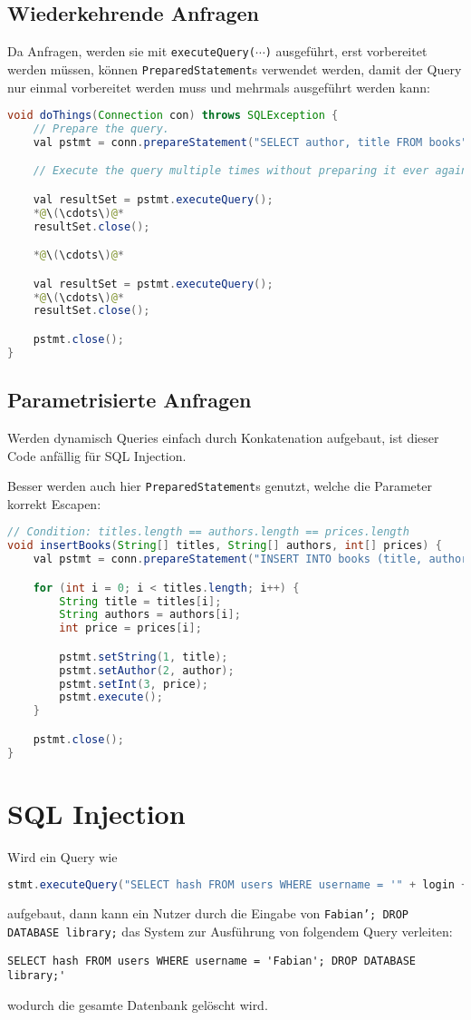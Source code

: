 		\subsection{Wiederkehrende Anfragen} %
			Da Anfragen, werden sie mit \texttt{executeQuery(\(\cdots\))} ausgeführt, erst vorbereitet werden müssen, können \texttt{PreparedStatement}s verwendet werden, damit der Query nur einmal vorbereitet werden muss und mehrmals ausgeführt werden kann:
			\begin{lstlisting}[language = Java]
void doThings(Connection con) throws SQLException {
	// Prepare the query.
	val pstmt = conn.prepareStatement("SELECT author, title FROM books");

	// Execute the query multiple times without preparing it ever again.

	val resultSet = pstmt.executeQuery();
	*@\(\cdots\)@*
	resultSet.close();

	*@\(\cdots\)@*

	val resultSet = pstmt.executeQuery();
	*@\(\cdots\)@*
	resultSet.close();

	pstmt.close();
}
        	\end{lstlisting}

		\subsection{Parametrisierte Anfragen} %
			Werden dynamisch Queries einfach durch Konkatenation aufgebaut, ist dieser Code anfällig für SQL Injection.

			Besser werden auch hier \texttt{PreparedStatement}s genutzt, welche die Parameter korrekt Escapen:
			\begin{lstlisting}[language = Java]
// Condition: titles.length == authors.length == prices.length
void insertBooks(String[] titles, String[] authors, int[] prices) {
	val pstmt = conn.prepareStatement("INSERT INTO books (title, author, price), (?, ?, ?)");

	for (int i = 0; i < titles.length; i++) {
		String title = titles[i];
		String authors = authors[i];
		int price = prices[i];

		pstmt.setString(1, title);
		pstmt.setAuthor(2, author);
		pstmt.setInt(3, price);
		pstmt.execute();
	}

	pstmt.close();
}
			\end{lstlisting}

	\section{SQL Injection} %
		Wird ein Query wie
		\begin{lstlisting}[language = Java]
stmt.executeQuery("SELECT hash FROM users WHERE username = '" + login + "'");
		\end{lstlisting}
		aufgebaut, dann kann ein Nutzer durch die Eingabe von \texttt{Fabian'; DROP DATABASE library;} das System zur Ausführung von folgendem Query verleiten:
		\begin{lstlisting}
SELECT hash FROM users WHERE username = 'Fabian'; DROP DATABASE library;'
		\end{lstlisting}
		wodurch die gesamte Datenbank gelöscht wird.

